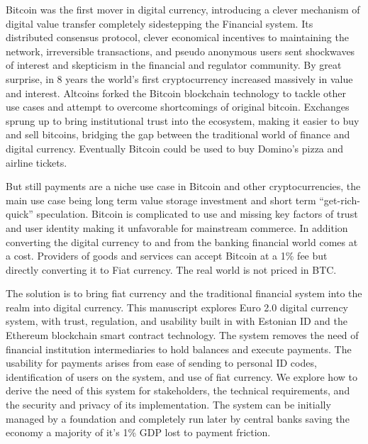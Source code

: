 \documentclass[12pt]{article} %
\begin{document}
Bitcoin was the first mover in digital currency, introducing a clever mechanism of digital value transfer completely sidestepping the Financial system. Its distributed consensus protocol, clever economical incentives to maintaining the network, irreversible transactions, and pseudo anonymous users sent shockwaves of interest and skepticism in the financial and regulator community. By great surprise, in 8 years the world's first cryptocurrency increased massively in value and interest. Altcoins forked the Bitcoin blockchain technology to tackle other use cases and attempt to overcome shortcomings of original bitcoin. Exchanges sprung up to bring institutional trust into the ecosystem, making it easier to buy and sell bitcoins, bridging the gap between the traditional world of finance and digital currency. Eventually Bitcoin could be used to buy Domino's pizza and airline tickets.

But still payments are a niche use case in Bitcoin and other cryptocurrencies, the main use case being long term value storage investment and short term ``get-rich-quick'' speculation. Bitcoin is complicated to use and missing key factors of trust and user identity making it unfavorable for mainstream commerce. In addition converting the digital currency to and from the banking financial world comes at a cost. Providers of goods and services can accept Bitcoin at a 1\% fee but directly converting it to Fiat currency. The real world is not priced in BTC.

The solution is to bring fiat currency and the traditional financial system into the realm into digital currency. This manuscript explores Euro 2.0 digital currency system, with trust, regulation, and usability built in with Estonian ID and the Ethereum blockchain smart contract technology. The system removes the need of financial institution intermediaries to hold balances and execute payments. The usability for payments arises from ease of sending to personal ID codes, identification of users on the system, and use of fiat currency. We explore how to derive the need of this system for stakeholders, the technical requirements, and the security and privacy of its implementation. The system can be initially managed by a foundation and completely run later by central banks saving the economy a majority of it's 1\% GDP lost to payment friction.
\end{document}
